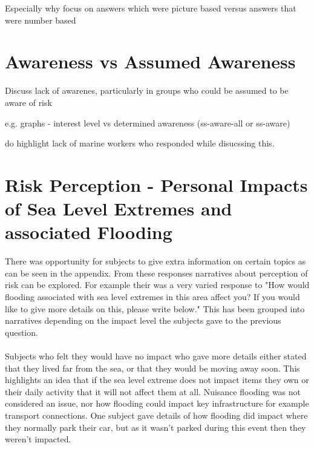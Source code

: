Especially why focus on answers which were picture based versus answers that were number based



\section{Awareness vs Assumed Awareness}
Discuss lack of awarenes, particularly in groups who could be assumed to be aware of risk

e.g. graphs - interest level vs determined awareness (ss-aware-all or ss-aware)

do highlight lack of marine workers who responded while disucssing this. 

\section{Risk Perception - Personal Impacts of Sea Level Extremes and associated Flooding}
There was opportunity for subjects to give extra information on certain topics as can be seen in the appendix. From these responses narratives about perception of risk can be explored. For example their was a very varied response to "How would flooding associated with sea level extremes in this area affect you? If you would like to give more details on this, please write below." This has been grouped into narratives depending on the impact level the subjects gave to the previous question.
\paragraph{}

Subjects who felt they would have no impact who gave more details either stated that they lived far from the sea, or that they would be moving away soon. This highlights an idea that if the sea level extreme does not impact items they own or their daily activity that it will not affect them at all. Nuisance flooding was not considered an issue, nor how flooding could impact key infrastructure for example transport connections. One subject gave details of how flooding did impact where they normally park their car, but as it wasn't parked during this event then they weren't impacted. 
\paragraph{}

